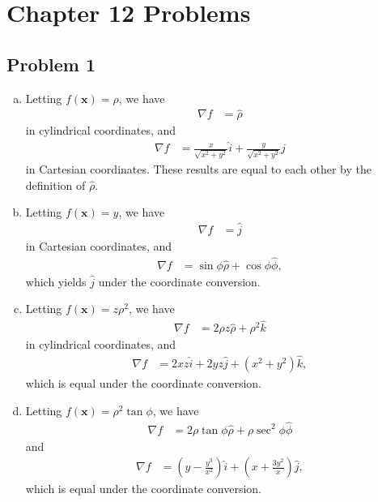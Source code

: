 \documentclass[10pt]{mypackage}
\begin{document}
\section{Chapter 12 Problems}%
\subsection{Problem 1}%
\begin{enumerate}[(a)]
  \item Letting $f\left(\mathbf{x}\right) = \rho$, we have
    \begin{align*}
      \nabla f &= \hat{\rho}
    \end{align*}
    in cylindrical coordinates, and
    \begin{align*}
      \nabla f &= \frac{x}{\sqrt{x^2 + y^2}}\hat{i} + \frac{y}{\sqrt{x^2 + y^2}}\hat{j}
    \end{align*}
    in Cartesian coordinates. These results are equal to each other by the definition of $\hat{\rho}$.
  \item Letting $f\left(\mathbf{x}\right)= y$, we have
    \begin{align*}
      \nabla f &= \hat{j}
    \end{align*}
    in Cartesian coordinates, and
    \begin{align*}
      \nabla f &= \sin\phi\hat{\rho} + \cos\phi\hat{\phi},
    \end{align*}
    which yields $\hat{j}$ under the coordinate conversion.
  \item Letting $f\left(\mathbf{x}\right) = z\rho^2$, we have
    \begin{align*}
      \nabla f &= 2\rho z \hat{\rho} + \rho^2\hat{k}
    \end{align*}
    in cylindrical coordinates, and
    \begin{align*}
      \nabla f &= 2xz\hat{i} + 2yz\hat{j} + \left(x^2 + y^2\right)\hat{k},
    \end{align*}
    which is equal under the coordinate conversion.
  \item Letting $f\left(\mathbf{x}\right) = \rho^2\tan\phi$, we have
    \begin{align*}
      \nabla f &= 2\rho\tan\phi\hat{\rho} + \rho\sec^2\phi\hat{\phi}
    \end{align*}
    and
    \begin{align*}
      \nabla f &= \left(y - \frac{y^3}{x^2}\right)\hat{i} + \left(x + \frac{3y^2}{x}\right)\hat{j},
    \end{align*}
    which is equal under the coordinate conversion.
\end{enumerate}
\end{document}
